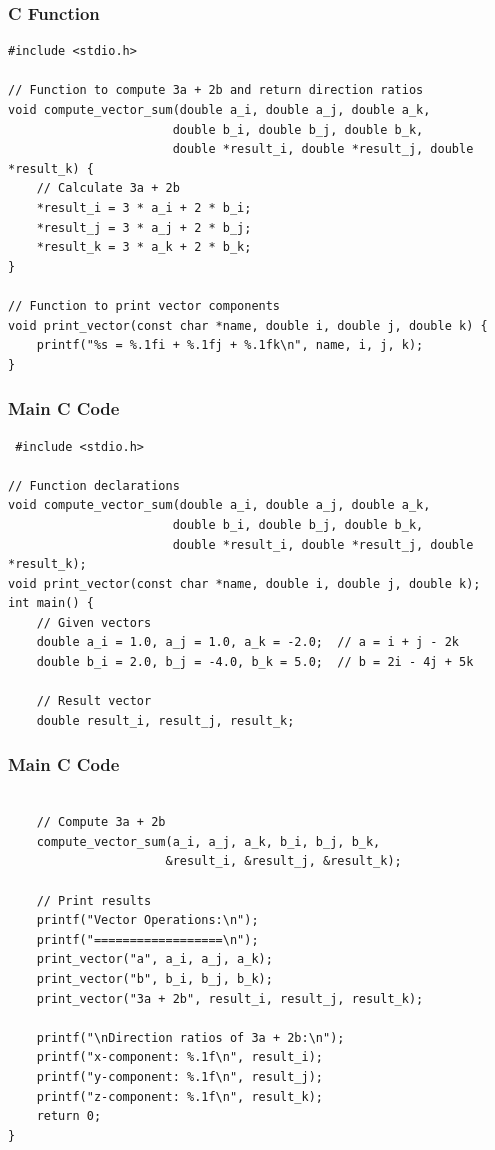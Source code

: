 \documentclass{beamer}
\begin{document}
\begin{frame}[fragile]
\frametitle{C Function}
   \begin{lstlisting}
#include <stdio.h>

// Function to compute 3a + 2b and return direction ratios
void compute_vector_sum(double a_i, double a_j, double a_k, 
                       double b_i, double b_j, double b_k,
                       double *result_i, double *result_j, double *result_k) {
    // Calculate 3a + 2b
    *result_i = 3 * a_i + 2 * b_i;
    *result_j = 3 * a_j + 2 * b_j;
    *result_k = 3 * a_k + 2 * b_k;
}

// Function to print vector components
void print_vector(const char *name, double i, double j, double k) {
    printf("%s = %.1fi + %.1fj + %.1fk\n", name, i, j, k);
}
   \end{lstlisting}
\end{frame}
\begin{frame}[fragile]
\frametitle{Main C Code}
   \begin{lstlisting}
 #include <stdio.h>

// Function declarations
void compute_vector_sum(double a_i, double a_j, double a_k, 
                       double b_i, double b_j, double b_k,
                       double *result_i, double *result_j, double *result_k);
void print_vector(const char *name, double i, double j, double k);
int main() {
    // Given vectors
    double a_i = 1.0, a_j = 1.0, a_k = -2.0;  // a = i + j - 2k
    double b_i = 2.0, b_j = -4.0, b_k = 5.0;  // b = 2i - 4j + 5k
    
    // Result vector
    double result_i, result_j, result_k;
   \end{lstlisting}
\end{frame}
\begin{frame}[fragile]
\frametitle{Main C Code}
   \begin{lstlisting}
  
    // Compute 3a + 2b
    compute_vector_sum(a_i, a_j, a_k, b_i, b_j, b_k, 
                      &result_i, &result_j, &result_k);
    
    // Print results
    printf("Vector Operations:\n");
    printf("==================\n");
    print_vector("a", a_i, a_j, a_k);
    print_vector("b", b_i, b_j, b_k);
    print_vector("3a + 2b", result_i, result_j, result_k);
    
    printf("\nDirection ratios of 3a + 2b:\n");
    printf("x-component: %.1f\n", result_i);
    printf("y-component: %.1f\n", result_j);
    printf("z-component: %.1f\n", result_k);
    return 0;
}
   \end{lstlisting}
\end{frame}
\end{document}
